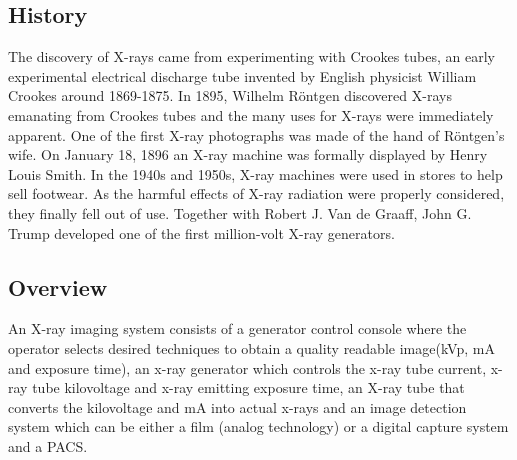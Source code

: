 \documentclass[12pt]{article}
\begin{document}
\subsection{History}
The discovery of X-rays came from experimenting with Crookes tubes, an early experimental electrical discharge tube invented by English physicist William Crookes around 1869-1875.
In 1895, Wilhelm Röntgen discovered X-rays emanating from Crookes tubes and the many uses for X-rays were immediately apparent.
One of the first X-ray photographs was made of the hand of Röntgen's wife.
On January 18, 1896 an X-ray machine was formally displayed by Henry Louis Smith.
In the 1940s and 1950s, X-ray machines were used in stores to help sell footwear.
As the harmful effects of X-ray radiation were properly considered, they finally fell out of use.
Together with Robert J. Van de Graaff, John G. Trump developed one of the first million-volt X-ray generators.


\subsection{Overview}
An X-ray imaging system consists of a generator control console where the operator selects desired techniques to obtain a quality readable image(kVp, mA and exposure time), an x-ray generator which controls the x-ray tube current, x-ray tube kilovoltage and x-ray emitting exposure time, an X-ray tube that converts the kilovoltage and mA into actual x-rays and an image detection system which can be either a film (analog technology) or a digital capture system and a PACS.
\end{document}
